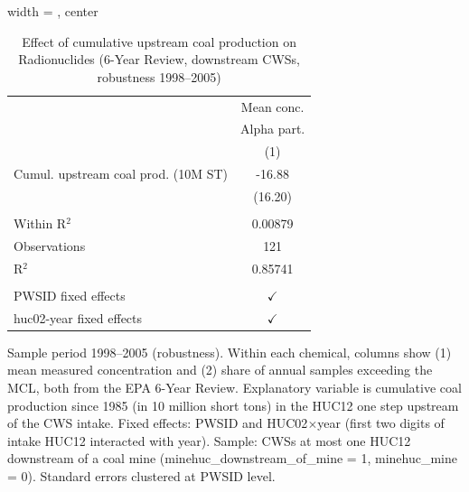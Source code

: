 
\begin{table}[htbp]
   
   \caption{\label{tab:6yr_huc02fe_radio_2005} Effect of cumulative upstream coal production on Radionuclides (6-Year Review, downstream CWSs, robustness 1998--2005)}
   \bigskip
   
   \centering
   
   \begin{adjustbox}{width = \textwidth, center}
      
      
      \begin{tabular}{lc}
         \toprule
         
                                             & Mean conc.\\  
         
                                             & Alpha part. \\   
         
                                             & (1)\\  
         
         \midrule 
         Cumul. upstream coal prod. (10M ST) & -16.88\\   
                                             & (16.20)\\   
         
          \\
         
         Within R$^2$                        & 0.00879\\  
         Observations                        & 121\\  
         R$^2$                               & 0.85741\\  
         
          \\
         
         PWSID fixed effects                 & $\checkmark$\\   
         huc02-year fixed effects            & $\checkmark$\\   
         
         \bottomrule
         
      \end{tabular}
      
      
      
   \end{adjustbox}
      {\tiny\linespread{1}\selectfont \par \raggedright 
   Sample period 1998--2005 (robustness). Within each chemical, columns show (1) mean measured concentration and (2) share of annual samples exceeding the MCL, both from the EPA 6-Year Review. Explanatory variable is cumulative coal production since 1985 (in 10 million short tons) in the HUC12 one step upstream of the CWS intake. Fixed effects: PWSID and HUC02$\times$year (first two digits of intake HUC12 interacted with year). Sample: CWSs at most one HUC12 downstream of a coal mine (minehuc\_downstream\_of\_mine = 1, minehuc\_mine = 0). Standard errors clustered at PWSID level.}
   
\end{table}



